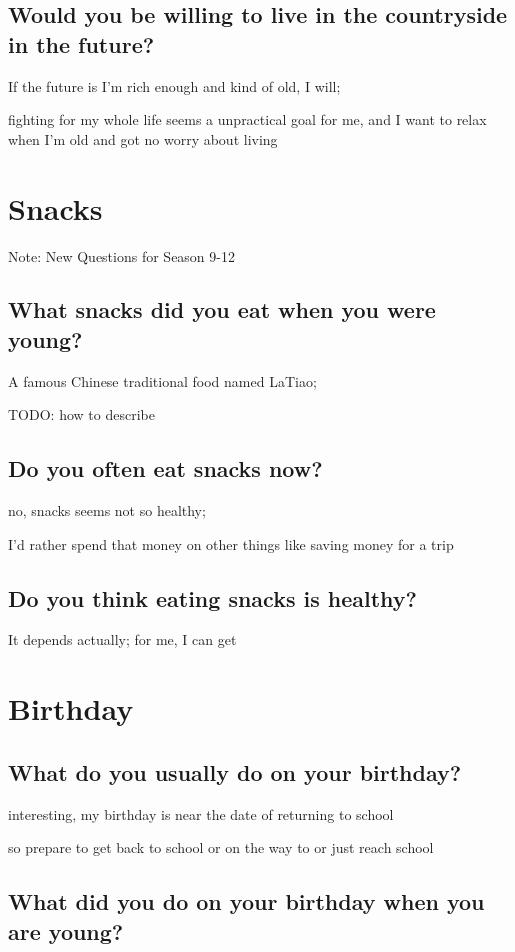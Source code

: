 \documentclass[conference]{IEEEtran}
\begin{document}
\subsection{Would you be willing to live in the countryside in the future?}
If the future is I'm rich enough and kind of old, I will;

fighting for my whole life seems a unpractical goal for me,
and I want to relax when I'm old and got no worry about living

\section{Snacks}
Note: New Questions for Season 9-12

\subsection{What snacks did you eat when you were young?}
A famous Chinese traditional food named LaTiao;

TODO: how to describe

\subsection{Do you often eat snacks now?}
no, snacks seems not so healthy;

I'd rather spend that money on other things like saving money
for a trip

\subsection{Do you think eating snacks is healthy?}
It depends actually;
for me, I can get 

\section{Birthday}
\subsection{What do you usually do on your birthday?}
interesting, my birthday is near the date of returning to school

so prepare to get back to school or on the way to or just reach school

\subsection{What did you do on your birthday when you are young?}
\end{document}
